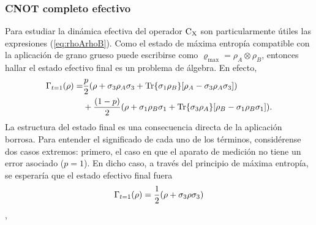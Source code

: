 \subsubsection{CNOT completo efectivo}

Para estudiar la dinámica efectiva del operador $\text{C}_{\text{X}}$ son particularmente útiles las expresiones (\ref{eq:rhoArhoB}). Como el estado de máxima entropía compatible con la aplicación de grano grueso puede escribirse como $\varrho_{\max}=\rho_{A}\otimes\rho_{B}$, entonces hallar el estado efectivo final es un problema de álgebra. En efecto,
\begin{align*}
    \Gamma_{t=1}(\rho)=&\frac{p}{2}(\rho+\sigma_{3}\rho_{A}\sigma_{3}+\Tr{\sigma_{1}\rho_{B}}[\rho_{A}-\sigma_{3}\rho_{A}\sigma_{3}])\\
    &+\frac{(1-p)}{2}(\rho+\sigma_{1}\rho_{B}\sigma_{1}+\Tr{\sigma_{3}\rho_{A}}[\rho_{B}-\sigma_{1}\rho_{B}\sigma_{1}]).
\end{align*}
La estructura del estado final es una consecuencia directa de la aplicación borrosa. Para entender el significado de cada uno de los términos, considérense dos casos extremos: primero, el caso en que el aparato de medición no tiene un error asociado ($p=1$). En dicho caso, a través del principio de máxima entropía, se esperaría que el estado efectivo final fuera
\begin{equation*}
  \Gamma_{t=1}(\rho)=\frac{1}{2}\qty(\rho+\sigma_{3}\rho\sigma_{3})
\end{equation*},
